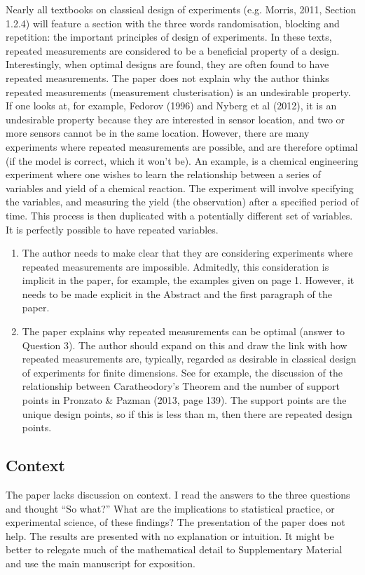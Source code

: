 \documentclass{amsart}
\begin{document}
Nearly all textbooks on classical design of experiments (e.g. Morris,
2011, Section 1.2.4) will feature a section with the three words
randomisation, blocking and repetition: the important principles of
design of experiments.  In these texts, repeated measurements are
considered to be a beneficial property of a design. Interestingly,
when optimal designs are found, they are often found to have repeated
measurements.  The paper does not explain why the author thinks
repeated measurements (measurement clusterisation) is an undesirable
property. If one looks at, for example, Fedorov (1996) and Nyberg et
al (2012), it is an undesirable property because they are interested
in sensor location, and two or more sensors cannot be in the same
location. However, there are many experiments where repeated
measurements are possible, and are therefore optimal (if the model is
correct, which it won’t be). An example, is a chemical engineering
experiment where one wishes to learn the relationship between a series
of variables and yield of a chemical reaction. The experiment will
involve specifying the variables, and measuring the yield (the
observation) after a specified period of time. This process is then
duplicated with a potentially different set of variables.  It is
perfectly possible to have repeated variables.

\begin{enumerate}
 
\item The author needs to make clear that they are considering
  experiments where repeated measurements are impossible. Admitedly,
  this consideration is implicit in the paper, for example, the
  examples given on page 1. However, it needs to be made explicit in
  the Abstract and the first paragraph of the paper.

\item The paper explains why repeated measurements can be optimal
  (answer to Question 3). The author should expand on this and draw
  the link with how repeated measurements are, typically, regarded as
  desirable in classical design of experiments for finite
  dimensions. See for example, the discussion of the relationship
  between Caratheodory’s Theorem and the number of support points in
  Pronzato \& Pazman (2013, page 139). The support points are the
  unique design points, so if this is less than m, then there are
  repeated design points.
\end{enumerate}

\subsection{Context}
The paper lacks discussion on context. I read the answers to the three
questions and thought “So what?”  What are the implications to
statistical practice, or experimental science, of these findings?  The
presentation of the paper does not help. The results are presented
with no explanation or intuition. It might be better to relegate much
of the mathematical detail to Supplementary Material and use the main
manuscript for exposition.
\end{document}

